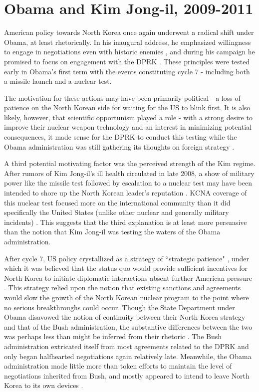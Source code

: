 \section{Obama and Kim Jong-il, 2009-2011}

American policy towards North Korea once again underwent a radical shift under Obama, at least rhetorically. In his inaugural address, he emphasized willingness to engage in negotiations even with historic enemies \cite{obama}, and during his campaign he promised to focus on engagement with the DPRK \cite{delury}. These principles were tested early in Obama's first term with the events constituting cycle 7 - including both a missile launch and a nuclear test.

The motivation for these actions may have been primarily political - a loss of patience on the North Korean side for waiting for the US to blink first. It is also likely, however, that scientific opportunism played a role - with a strong desire to improve their nuclear weapon technology and an interest in minimizing potential consequences, it made sense for the DPRK to conduct this testing while the Obama administration was still gathering its thoughts on foreign strategy \cite{hecker2}.

A third potential motivating factor was the perceived strength of the Kim regime. After rumors of Kim Jong-il's ill health circulated in late 2008, a show of military power like the missile test followed by escalation to a nuclear test may have been intended to shore up the North Korean leader's reputation \cite{hecker2}. KCNA coverage of this nuclear test focused more on the international community than it did specifically the United States (unlike other nuclear and generally military incidents) \cite{sin}. This suggests that the third explanation is at least more persuasive than the notion that Kim Jong-il was testing the waters of the Obama administration.

After cycle 7, US policy crystallized as a strategy of ``strategic patience" \cite{crs13}, under which it was believed that the status quo would provide sufficient incentives for North Korea to initiate diplomatic interactions absent further American pressure \cite{snyder2}. This strategy relied upon the notion that existing sanctions and agreements would slow the growth of the North Korean nuclear program to the point where no serious breakthroughs could occur. Though the State Department under Obama disavowed the notion of continuity between their North Korea strategy and that of the Bush administration, the substantive differences between the two was perhaps less than might be inferred from their rhetoric \cite{delury}. The Bush administration extricated itself from most agreements related to the DPRK and only began halfhearted negotiations again relatively late. Meanwhile, the Obama administration made little more than token efforts to maintain the level of negotiations inherited from Bush, and mostly appeared to intend to leave North Korea to its own devices \cite{delury}.

